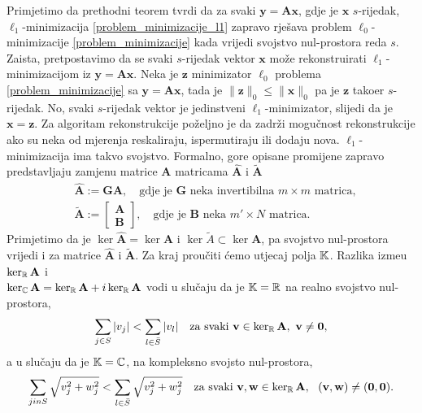 \documentclass[a4paper,twoside,12pt]{memoir} %
\newcommand{\vect}[1]{\mathbf{#1}}
\renewcommand{\vec}{\vect}
\newcommand{\norm}[1]{\|{#1}\|}
\begin{document}
Primjetimo da prethodni teorem tvrdi da za svaki $\vec y = \vec{Ax}$, gdje je $\vec x$ $s$-rijedak, $\ell_1$-minimizacija \eqref{problem_minimizacije_l1} zapravo rje\v{s}ava problem $\ell_0$-minimizacije \eqref{problem_minimizacije} kada vrijedi svojstvo nul-prostora reda $s$. Zaista, pretpostavimo da se svaki $s$-rijedak vektor $\vec{x}$ mo\v{z}e rekonstruirati $\ell_1$-minimizacijom iz $\vec y = \vec{Ax}$. Neka je $\vec z$ minimizator $\ell_0$ problema \eqref{problem_minimizacije} sa $\vec y = \vec{Ax}$, tada je $\norm{\vec z}_0 \leq \norm{\vec x}_0$ pa je $\vec z$ tako\dj er $s$-rijedak. No, svaki $s$-rijedak vektor je jedinstveni $\ell_1$-minimizator, slijedi da je $\vec x = \vec z$.
\newline \indent
Za algoritam rekonstrukcije po\v{z}eljno je da zadr\v{z}i mogu\v{c}nost rekonstrukcije ako su neka od mjerenja reskaliraju, ispermutiraju ili dodaju nova. $\ell_1$-minimizacija ima takvo svojstvo. Formalno, gore opisane promijene zapravo predstavljaju zamjenu matrice $\vec A$ matricama $\vec{\hat A}$ i $\vec{\tilde A}$
\begin{align*}
    & \vec{\hat A} := \vec{GA}, \quad \text{gdje je }\vec{G}\text{ neka invertibilna }m \times m \text{ matrica},\\
    & \vec{\tilde A} := 
    \begin{bmatrix*}
        \vec A \\ \vec B
    \end{bmatrix*}
    , \quad \text{gdje je }\vec{B}\text{ neka }m' \times N \text{ matrica}.
\end{align*}
Primjetimo da je $\ker \vec{\hat A} = \ker \vec A$ i $\ker \tilde A \subset \ker \vec A$, pa svojstvo nul-prostora vrijedi i za matrice $\vec{\hat A}$ i $\vec{\tilde A}$.
\newline
\newline
\indent
Za kraj prou\v{c}iti \'cemo utjecaj polja $\mathbb{K}$. Razlika izme\dj u $\ker_{\R}\vec A$ i\\ $\ker_{\C} \vec A = \ker_{\R} \vec A + i \ker_{\R} \vec A$ vodi u slu\v{c}aju da je $\mathbb{K}=\mathbb{R}$ na realno svojstvo nul-prostora, 
\begin{equation}\label{svojstvo_nul_prostora_realno}
    \sum_{j \in S}|v_j| < \sum_{l \in \bar{S}}|v_l| \quad \text{za svaki } \vec v \in \ker_{\R} \vec A,\ \vec v \neq \vec 0,  
\end{equation}
a u slu\v{c}aju da je $\mathbb{K} = \mathbb{C}$, na kompleksno svojsto nul-prostora,
\begin{equation}\label{svojstvo_nul_prostora_kompleksno}
    \sum_{j in S}\sqrt{v_j^2 + w_j^2} < \sum_{l \in \bar{S}}\sqrt{v_j^2 + w_j^2}\quad \text{za svaki } \vec v, \vec w \in \ker_{\R} \vec A,\ \ ( \vec v, \vec w ) \neq \vec (\vec 0,\vec 0).  
\end{equation}
\end{document}
